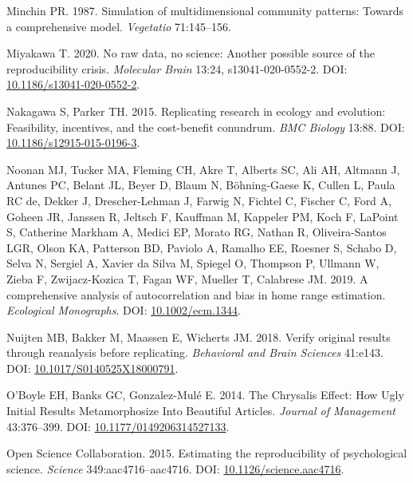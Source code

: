 \documentclass[10pt,a4paper]{article}
\newlength{\cslhangindent}
\newlength{\cslentryspacingunit} %
\newenvironment{CSLReferences}[2] %
 {%
  \setlength{\parindent}{0pt}
  \ifodd #1
  \let\oldpar\par
  \def\par{\hangindent=\cslhangindent\oldpar}
  \fi
  \setlength{\parskip}{#2\cslentryspacingunit}
 }%
 {}
\begin{document}
\begin{CSLReferences}{1}{0}
\leavevmode{}%
Minchin PR. 1987. Simulation of multidimensional community patterns: Towards a comprehensive model. \emph{Vegetatio} 71:145--156.

\leavevmode{}%
Miyakawa T. 2020. No raw data, no science: Another possible source of the reproducibility crisis. \emph{Molecular Brain} 13:24, s13041-020-0552-2. DOI: \href{https://doi.org/10.1186/s13041-020-0552-2}{10.1186/s13041-020-0552-2}.

\leavevmode{}%
Nakagawa S, Parker TH. 2015. Replicating research in ecology and evolution: Feasibility, incentives, and the cost-benefit conundrum. \emph{BMC Biology} 13:88. DOI: \href{https://doi.org/10.1186/s12915-015-0196-3}{10.1186/s12915-015-0196-3}.

\leavevmode{}%
Noonan MJ, Tucker MA, Fleming CH, Akre T, Alberts SC, Ali AH, Altmann J, Antunes PC, Belant JL, Beyer D, Blaum N, Böhning-Gaese K, Cullen L, Paula RC de, Dekker J, Drescher-Lehman J, Farwig N, Fichtel C, Fischer C, Ford A, Goheen JR, Janssen R, Jeltsch F, Kauffman M, Kappeler PM, Koch F, LaPoint S, Catherine Markham A, Medici EP, Morato RG, Nathan R, Oliveira-Santos LGR, Olson KA, Patterson BD, Paviolo A, Ramalho EE, Roesner S, Schabo D, Selva N, Sergiel A, Xavier da Silva M, Spiegel O, Thompson P, Ullmann W, Zieba F, Zwijacz-Kozica T, Fagan WF, Mueller T, Calabrese JM. 2019. A comprehensive analysis of autocorrelation and bias in home range estimation. \emph{Ecological Monographs}. DOI: \href{https://doi.org/10.1002/ecm.1344}{10.1002/ecm.1344}.

\leavevmode{}%
Nuijten MB, Bakker M, Maassen E, Wicherts JM. 2018. Verify original results through reanalysis before replicating. \emph{Behavioral and Brain Sciences} 41:e143. DOI: \href{https://doi.org/10.1017/S0140525X18000791}{10.1017/S0140525X18000791}.

\leavevmode{}%
O'Boyle EH, Banks GC, Gonzalez-Mulé E. 2014. The {Chrysalis} {Effect}: {How} {Ugly} {Initial} {Results} {Metamorphosize} {Into} {Beautiful} {Articles}. \emph{Journal of Management} 43:376--399. DOI: \href{https://doi.org/10.1177/0149206314527133}{10.1177/0149206314527133}.

\leavevmode{}%
Open Science Collaboration. 2015. Estimating the reproducibility of psychological science. \emph{Science} 349:aac4716--aac4716. DOI: \href{https://doi.org/10.1126/science.aac4716}{10.1126/science.aac4716}.


\end{CSLReferences}
\end{document}
